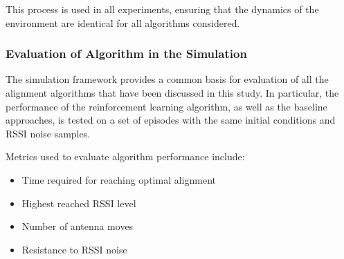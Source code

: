 This process is used in all experiments, ensuring that the dynamics of the
environment are identical for all algorithms considered.

\subsubsection{Evaluation of Algorithm in the Simulation}

The simulation framework provides a common basis for evaluation of all the alignment
algorithms that have been discussed in this study. In particular, the performance of the reinforcement
learning algorithm, as well as the baseline approaches, is tested on a set of episodes with the same
initial conditions and RSSI noise samples.

Metrics used to evaluate algorithm performance include:
\begin{itemize}
    \item Time required for reaching optimal alignment
    \item Highest reached RSSI level
    \item Number of antenna moves
    \item Resistance to RSSI noise
\end{itemize}
